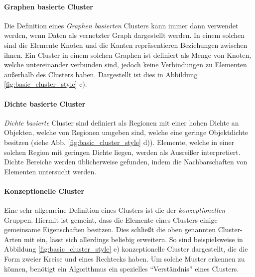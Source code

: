 \paragraph{Graphen basierte Cluster}
Die Definition eines \textit{Graphen basierten} Clusters kann immer dann verwendet werden, wenn Daten
als vernetzter Graph dargestellt werden. In einem solchen sind die Elemente Knoten und die Kanten
repräsentieren Beziehungen zwischen ihnen. Ein Cluster in einem solchen Graphen ist definiert als Menge von
Knoten, welche untereinander verbunden sind, jedoch keine Verbindungen zu Elementen außerhalb des Clusters haben.
Dargestellt ist dies in Abbildung \ref{fig:basic_cluster_style} c).

\paragraph{Dichte basierte Cluster}
\textit{Dichte basierte} Cluster sind definiert als Regionen mit einer hohen Dichte an Objekten, welche von
Regionen umgeben sind, welche eine geringe Objektdichte besitzen (siehe Abb. \ref{fig:basic_cluster_style} d)). Elemente, welche in einer solchen Region
mit geringen Dichte liegen, werden als Ausreißer interpretiert. Dichte Bereiche werden üblicherweise
gefunden, indem die Nachbarschaften von Elementen untersucht werden.

\paragraph{Konzeptionelle Cluster}
Eine sehr allgemeine Definition eines Clusters ist die der \textit{konzeptionellen} Gruppen. Hiermit ist
gemeint, dass die Elemente eines Clusters einige gemeinsame Eigenschaften besitzen. Dies schließt die oben genannten
Cluster-Arten mit ein, lässt sich allerdings beliebig erweitern. So sind beispielsweise in Abbildung \ref{fig:basic_cluster_style} e)
konzeptionelle Cluster dargestellt, die die Form zweier Kreise und eines Rechtecks haben. Um solche Muster
erkennen zu können, benötigt ein Algorithmus ein spezielles ``Verständnis'' eines Clusters.


